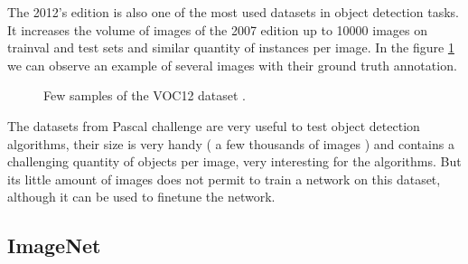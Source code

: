 The 2012's edition \cite{voc12website} is also one of the most used datasets in object detection tasks. It increases the volume of images of the 2007 edition up to 10000 images on trainval and test sets and similar quantity of instances per image. In the figure \ref{voc12data} we can observe an example of several images with their ground truth annotation.


\begin{figure}[H]
		
\centering
{}
\caption{Few samples of the VOC12 dataset .} \label{voc12data}

\end{figure}


The datasets from Pascal challenge are very useful to test object detection algorithms, their size is very handy ( a few thousands of images ) and contains a challenging quantity of objects per image, very interesting for the algorithms. But its little amount of images does not permit to train a network on this dataset, although it can be used to finetune the network.


\subsection{ImageNet}



